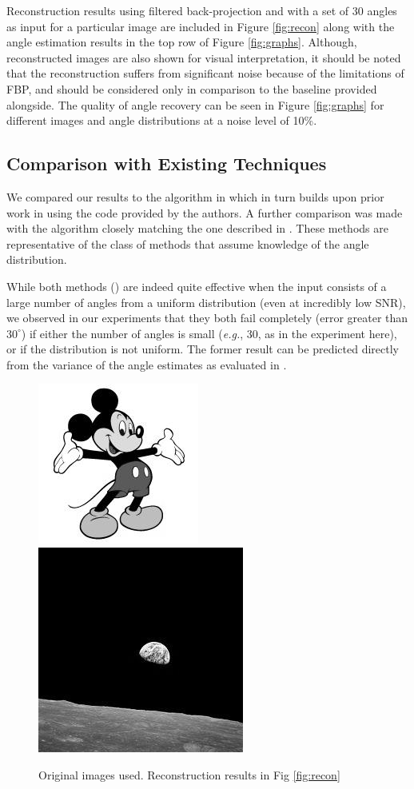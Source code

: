 \documentclass{article}
\begin{document}
Reconstruction results using filtered back-projection and with a set of 30 angles as input for a particular image are included in Figure \ref{fig:recon} along with the angle estimation results in the top row of Figure \ref{fig:graphs}. Although, reconstructed images are also shown for visual interpretation, it should be noted that the reconstruction suffers from significant noise because of the limitations of FBP, and should be considered only in comparison to the baseline provided alongside. The quality of angle recovery can be seen in Figure \ref{fig:graphs} for different images and angle distributions at a noise level of 10\%.   

\subsection{Comparison with Existing Techniques}
We compared our results to the algorithm in \cite{singer2013} which in turn builds upon prior work in \cite{graphlaplacian} using the code provided by the authors. A further comparison was made with the  algorithm closely matching the one described in \cite{feasibility}.  These methods are representative of the class of methods that assume knowledge of the angle distribution. 

While both methods (\cite{feasibility, singer2013}) are indeed quite effective when the input consists of a large number of angles from a uniform distribution (even at incredibly low SNR), we observed in our experiments that they both fail completely (error greater than $30^{\circ}$) if either the number of angles is small (\textit{e.g.}, 30, as in the experiment here), or if the distribution is not uniform. The former result can be predicted directly from the variance of the angle estimates as evaluated in \cite{graphlaplacian}. 


\begin{figure}[htb]
\centering
\includegraphics[width=0.25\linewidth]{images/mickey_grey.jpg}
\includegraphics[width=0.25\linewidth]{images/earthrise_actual.jpg}
\caption{Original images used. Reconstruction results in Fig \ref{fig:recon}}
\label{fig:original}
\end{figure}
\end{document}
